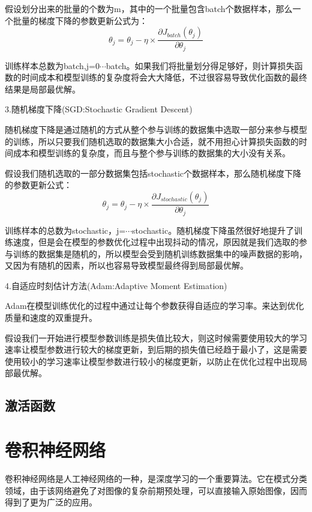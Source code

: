 \documentclass[openbib]{article}
\begin{document}
假设划分出来的批量的个数为m，其中的一个批量包含batch个数据样本，那么一个批量的梯度下降的参数更新公式为：
$$\theta_j=\theta_j-\eta\times\frac{\partial J_{batch}(\theta_j)}{\partial \theta_j}$$

训练样本总数为batch,j=0$\cdots$batch。如果我们将批量划分得足够好，则计算损失函数的时间成本和模型训练的复杂度将会大大降低，不过很容易导致优化函数的最终结果是局部最优解。

\begin{center}
	3.随机梯度下降(SGD:Stochastic Gradient Descent)
\end{center}

随机梯度下降是通过随机的方式从整个参与训练的数据集中选取一部分来参与模型的训练，所以只要我们随机选取的数据集大小合适，就不用担心计算损失函数的时间成本和模型训练的复杂度，而且与整个参与训练的数据集的大小没有关系。

假设我们随机选取的一部分数据集包括stochastic个数据样本，那么随机梯度下降的参数更新公式：
$$\theta_j=\theta_j-\eta\times\frac{\partial J_{stochastic}(\theta_j)}{\partial\theta_j}$$

训练样本的总数为stochastic，j=$\cdots$stochastic。随机梯度下降虽然很好地提升了训练速度，但是会在模型的参数优化过程中出现抖动的情况，原因就是我们选取的参与训练的数据集是随机的，所以模型会受到随机训练数据集中的噪声数据的影响，又因为有随机的因素，所以也容易导致模型最终得到局部最优解。

\begin{center}
	4.自适应时刻估计方法(Adam:Adaptive Moment Estimation)
\end{center}

Adam在模型训练优化的过程中通过让每个参数获得自适应的学习率。来达到优化质量和速度的双重提升。

假设我们一开始进行模型参数训练是损失值比较大，则这时候需要使用较大的学习速率让模型参数进行较大的梯度更新，到后期的损失值已经趋于最小了，这是需要使用较小的学习速率让模型参数进行较小的梯度更新，以防止在优化过程中出现局部最优解。

\subsection{激活函数}

\section{卷积神经网络}
卷积神经网络是人工神经网络的一种，是深度学习的一个重要算法。它在模式分类领域，由于该网络避免了对图像的复杂前期预处理，可以直接输入原始图像，因而得到了更为广泛的应用。
\end{document}
